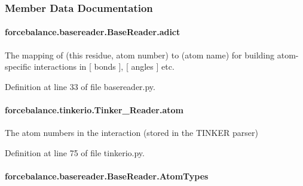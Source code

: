 \subsubsection{Member Data Documentation}
\hypertarget{classforcebalance_1_1basereader_1_1BaseReader_a84a513e0e43145b2fdaf38e73c32f83a}{
\paragraph[{adict}]{\setlength{\rightskip}{0pt plus 5cm}forcebalance.\-basereader.\-Base\-Reader.\-adict\hspace{0.3cm}{\ttfamily [inherited]}}}\label{classforcebalance_1_1basereader_1_1BaseReader_a84a513e0e43145b2fdaf38e73c32f83a}


The mapping of (this residue, atom number) to (atom name) for building atom-\/specific interactions in \mbox{[} bonds \mbox{]}, \mbox{[} angles \mbox{]} etc. 



Definition at line 33 of file basereader.\-py.

\hypertarget{classforcebalance_1_1tinkerio_1_1Tinker__Reader_a77b335b67d8e723248ac52515867607d}{
\paragraph[{atom}]{\setlength{\rightskip}{0pt plus 5cm}forcebalance.\-tinkerio.\-Tinker\-\_\-\-Reader.\-atom}}\label{classforcebalance_1_1tinkerio_1_1Tinker__Reader_a77b335b67d8e723248ac52515867607d}


The atom numbers in the interaction (stored in the T\-I\-N\-K\-E\-R parser) 



Definition at line 75 of file tinkerio.\-py.

\hypertarget{classforcebalance_1_1basereader_1_1BaseReader_ad5765e192499937376950410364014af}{
\paragraph[{Atom\-Types}]{\setlength{\rightskip}{0pt plus 5cm}forcebalance.\-basereader.\-Base\-Reader.\-Atom\-Types\hspace{0.3cm}{\ttfamily [inherited]}}}\label{classforcebalance_1_1basereader_1_1BaseReader_ad5765e192499937376950410364014af}


